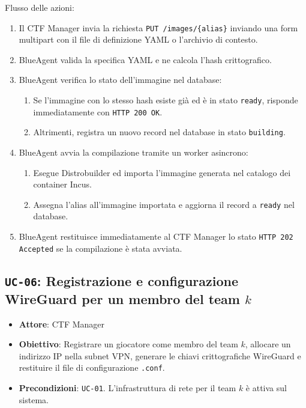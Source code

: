 Flusso delle azioni:

\begin{enumerate}
\def\labelenumi{\arabic{enumi}.}
\tightlist
\item
  Il CTF Manager invia la richiesta
  \passthrough{\lstinline!PUT /images/\{alias\}!} inviando una form
  multipart con il file di definizione YAML o l'archivio di contesto.
\item
  BlueAgent valida la specifica YAML e ne calcola l'hash crittografico.
\item
  BlueAgent verifica lo stato dell'immagine nel database:

  \begin{enumerate}
  \def\labelenumii{\arabic{enumii}.}
  \tightlist
  \item
    Se l'immagine con lo stesso hash esiste già ed è in stato
    \passthrough{\lstinline!ready!}, risponde immediatamente con
    \passthrough{\lstinline!HTTP 200 OK!}.
  \item
    Altrimenti, registra un nuovo record nel database in stato
    \passthrough{\lstinline!building!}.
  \end{enumerate}
\item
  BlueAgent avvia la compilazione tramite un worker asincrono:

  \begin{enumerate}
  \def\labelenumii{\arabic{enumii}.}
  \tightlist
  \item
    Esegue Distrobuilder ed importa l'immagine generata nel catalogo dei
    container Incus.
  \item
    Assegna l'alias all'immagine importata e aggiorna il record a
    \passthrough{\lstinline!ready!} nel database.
  \end{enumerate}
\item
  BlueAgent restituisce immediatamente al CTF Manager lo stato
  \passthrough{\lstinline!HTTP 202 Accepted!} se la compilazione è stata
  avviata.
\end{enumerate}

\subsection{\texorpdfstring{\texttt{UC-06}: Registrazione e
configurazione WireGuard per un membro del team
\(k\)}{UC-06: Registrazione e configurazione WireGuard per un membro del team k}}\label{uc-06-registrazione-e-configurazione-wireguard-per-un-membro-del-team-k}

\begin{itemize}
\tightlist
\item
  \textbf{Attore}: CTF Manager
\item
  \textbf{Obiettivo}: Registrare un giocatore come membro del team
  \(k\), allocare un indirizzo IP nella subnet VPN, generare le chiavi
  crittografiche WireGuard e restituire il file di configurazione
  \passthrough{\lstinline!.conf!}.
\item
  \textbf{Precondizioni}: \passthrough{\lstinline!UC-01!}.
  L'infrastruttura di rete per il team \(k\) è attiva sul sistema.
\end{itemize}

